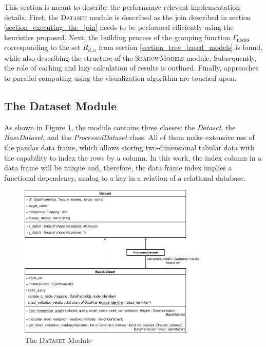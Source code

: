 This section is meant to describe the performance-relevant implementation details. First, the \textsc{Dataset} module is described as the join described in section \ref{section_executing_the_join} needs to be performed efficiently using the heuristics proposed. Next, the building process of the grouping function $\Gamma_\text{nodes}$ corresponding to the set $R_{d,u}$ from section \ref{section_tree_based_models} is found, while also describing the structure of the \textsc{ShadowModels} module. Subsequently, the role of caching and lazy calculation of results is outlined. Finally, approaches to parallel computing using the visualization algorithm are touched upon.

\subsection{The Dataset Module}
As shown in Figure \ref{fig:implementation_dataset}, the module contains three classes: the \emph{Dataset}, the \emph{BaseDataset}, and the \emph{ProcessedDataset} class. All of them make extensive use of the pandas data frame, which allows storing two-dimensional tabular data with the capability to index the rows by a column. In this work, the index column in a data frame will be unique and, therefore, the data frame index implies a functional dependency, analog to a key in a relation of a relational database.

\begin{figure}
    \centering
    \includegraphics[width=0.8\textwidth]{images/implementation/class_diagram_dataset.png}
    \caption{The \textsc{Dataset} Module}
    \label{fig:implementation_dataset}
\end{figure}

